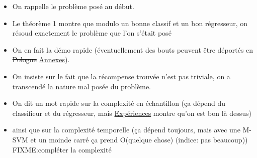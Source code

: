 \documentclass[11pt]{article}
\begin{document}
\begin{itemize}
\item On rappelle le problème posé au début.
\item Le théorème 1 montre que modulo un bonne classif et un bon régresseur, on résoud exactement le problème que l'on s'était posé
\item On en fait la démo rapide (éventuellement des bouts peuvent être déportés en \st{Pologne} \hyperref[sec-9]{Annexes}).
\item On insiste sur le fait que la récompense trouvée n'est pas triviale, on a transcendé la nature mal posée du problème.
\item On dit un mot rapide sur la complexité en échantillon (ça dépend du classifieur et du régresseur, mais \hyperref[sec-6]{Expériences} montre qu'on est bon là dessus)
\item ainsi que sur la complexité temporelle (ça dépend toujours, mais avec une M-SVM et un moinde carré ça prend O(quelque chose) (indice: pas beaucoup)) FIXME:compléter la complexité
\end{itemize}
\end{document}
